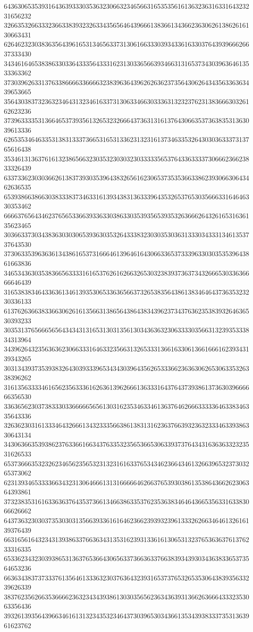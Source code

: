 64363065353931643639333035363230663234656631653535616136323631633164323231656232
32663532663332366338393232633435656464396661383661343662363062613862616130663431
62646232303836356439616531346563373130616633303934336163303764393966626637333430
34346164653838633033643335643331623130336566393466313165373430396364613533363362
37303962633137633866663366663238396364396262636237356430626434356336363439653665
35643038373236323464313234616337313063346630333631323237623138366630326162623236
37396333353136646537393561326532326664373631316137643066353736383531363039613336
62653534646335313831333736653165313362313231613734633532643030363337313765616438
35346131363761613238656632303532303032303333356537643363333730666236623833326439
63373362303036626138373930353964383265616230653735353663386239306630643462636535
65393866386630383338373463316139343831363339643532653765303566633164646330353462
66663765643462376565336639336330386330353935653935326366626432616531636135623465
30366337303438363030306539363035326433383230303530363133303433313461353737643530
37306335396363613438616537316664613964616430663365373339633030353539643861663836
34653436303538366563333161653762616266326530323839373637343266653033636666646439
31653838346433636134613935306533636566373265383564386138346464373635323230336133
61376263663833663062616135663138656438643834396237343763623538393264636530393233
30353137656665656434343131653130313561303436363230633330356631323935333834313964
34396264323563636230663331646332356631326533313661633061366166616239343139343265
30313439373539383264303933396534343039643562653336623636306265306335326338396262
31613563333461656235633361626361396266613633316437643739386137363039666666356530
33636562303738333033666665656130316235346334613637646266633333646338346335643336
32636230316133346432666134323335663861383131623637663932363233346339386330643134
34306366353938623763366166343763353235653665306339373764343163636332323531626533
65373666353232623465623565323132316163376534346236643461326639653237303265373062
62313934653333663432313064666131316666646266376539303861353864366262306364393861
37323835316163363637643537366134663863353762353638346464366535633163383066626662
64373632303037353030313566393361616462366239393239613332626634646132616139376439
66316561643234313938633766363431353162393133616130653132376536363761376233316335
65336234323039386531363765366430656337366363376638393439303436383365373564653236
66363438373733376135646133363230376364323931653737653265353064383935633239626339
38376235626635366662363234343938613030356562363436393136626366643332353063356436
39326139356439663461613132343532346437303965303436613534393833373531363961623762
